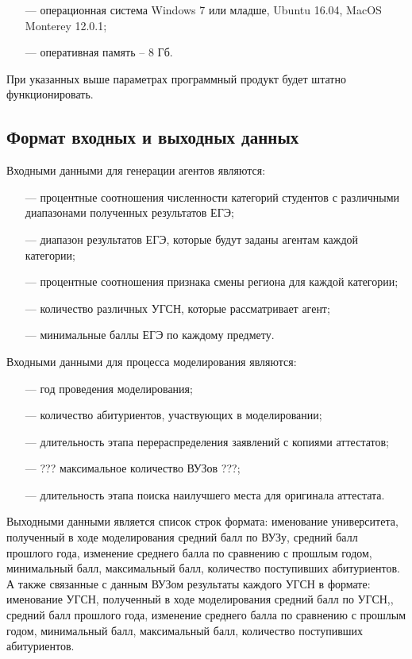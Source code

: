 \begin{itemize}[leftmargin=1.6\parindent]
	\item[---] операционная система Windows 7 или младше, Ubuntu 16.04, MacOS Monterey 12.0.1;
	\item[---] оперативная память – 8 Гб.
	
\end{itemize}

При указанных выше параметрах программный продукт будет штатно функционировать.

\subsection{Формат входных и выходных данных}

Входными данными для генерации агентов являются:

\begin{itemize}[leftmargin=1.6\parindent]
	\item[---] процентные соотношения численности категорий студентов с различными диапазонами полученных результатов ЕГЭ;
	\item[---] диапазон результатов ЕГЭ, которые будут заданы агентам каждой категории;
	\item[---] процентные соотношения признака смены региона для каждой категории;
	\item[---] количество различных УГСН, которые рассматривает агент;
	\item[---] минимальные баллы ЕГЭ по каждому предмету.
\end{itemize}

Входными данными для процесса моделирования являются:

\begin{itemize}[leftmargin=1.6\parindent]
	\item[---] год проведения моделирования;
	\item[---] количество абитуриентов, участвующих в моделировании;
	\item[---] длительность этапа перераспределения заявлений с копиями аттестатов;
	\item[---] ??? максимальное количество ВУЗов ???;
	\item[---] длительность этапа поиска наилучшего места для оригинала аттестата.
	
\end{itemize}

Выходными данными является список строк формата: именование университета, полученный в ходе моделирования средний балл по ВУЗу, средний балл прошлого года, изменение среднего балла по сравнению с прошлым годом, минимальный балл, максимальный балл, количество поступивших абитуриентов. А также связанные с данным ВУЗом результаты каждого УГСН в формате: именование УГСН, полученный в ходе моделирования средний балл по УГСН,, средний балл прошлого года, изменение среднего балла по сравнению с прошлым годом, минимальный балл, максимальный балл, количество поступивших абитуриентов.



